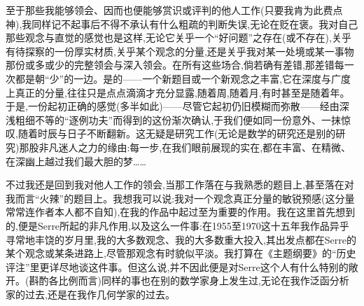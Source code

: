 \dmark{}至于那些我能够领会、因而也便能够赏识或评判的他人工作(只要我肯为此费点神),我同样记不起事后不得不承认有什么粗疏的判断失误,无论在贬在褒。我对自己那些观念与直觉的感觉也是这样,无论它关乎一个“好问题”之存在(或不存在),关乎有待探察的一份厚实材质,关乎某个观念的分量,还是关乎我对某一处境或某一事物那份或多或少的完整领会与深入领会。在所有这些场合,倘若确有差错,那差错每一次都是朝“少”的一边。是的——一个新题目或一个新观念之丰富,它在深度与广度上真正的分量,往往只是点点滴滴才充分显露,随着周,随着月,有时甚至是随着年。于是,一份起初正确的感觉(多半如此)——尽管它起初仍旧模糊而弥散——经由深浅粗细不等的“逐例功夫”而得到的这份渐次确认,于我们便如同一份意外、一抹惊叹,随着时辰与日子不断翻新。这无疑是研究工作(无论是数学的研究还是别的研究)那股非凡迷人之力的缘由:每一步,在我们眼前展现的实在,都在丰富、在精微、在深幽上越过我们最大胆的梦……

\noindent 不过我还是回到我对他人工作的领会,当那工作落在与我熟悉的题目上,甚至落在对我而言“火辣”的题目上。我想我可以说:我对一个观念真正分量的敏锐预感(这分量常常连作者本人都不自知),在我的作品中起过至为重要的作用。我在这里首先想到的,便是Serre所起的非凡作用,以及这么一件事:在1955至1970这十五年我作品异乎寻常地丰饶的岁月里,我的大多数观念、我的大多数重大投入,其出发点都在Serre的某个观念或某条进路上,尽管那观念有时貌似平淡。我打算在《主题纲要》的“历史评注”里更详尽地谈这件事。但这么说,并不因此便是对Serre这个人有什么特别的敞开。(斟酌各比例而言)同样的事也在别的数学家身上发生过,无论在我作泛函分析家的过去,还是在我作几何学家的过去。

